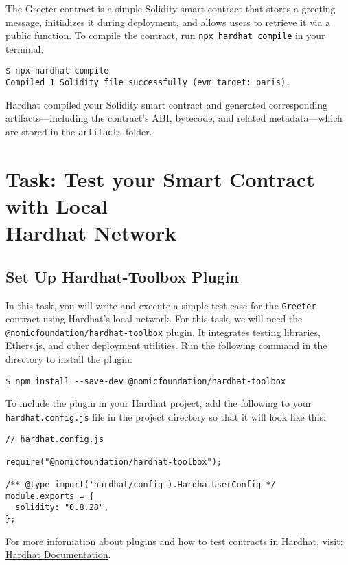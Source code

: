 \documentclass[12pt]{article}
\newcommand{\codeblack}[1]{%
  \texttt{\colorbox{black!7}{\textcolor{black}{#1}}}%
}
\begin{document}
The Greeter contract is a simple Solidity smart contract that stores a greeting message, initializes it during deployment, and allows users to retrieve it via a public function. To compile the contract, run \codeblack{npx hardhat compile} in your terminal.

\begin{verbatim}
$ npx hardhat compile
Compiled 1 Solidity file successfully (evm target: paris).
\end{verbatim}

Hardhat compiled your Solidity smart contract and generated corresponding artifacts—including the contract's ABI, bytecode, and related metadata—which are stored in the \texttt{artifacts} folder.

\section{Task: Test your Smart Contract with Local \\ Hardhat Network}

\subsection{Set Up Hardhat-Toolbox Plugin}
In this task, you will write and execute a simple test case for the \texttt{Greeter} contract using Hardhat's local network. For this task, we will need the \texttt{@nomicfoundation/hardhat-toolbox} plugin. It integrates testing libraries, Ethers.js, and other deployment utilities. Run the following command in the directory to install the plugin:

\begin{verbatim}
$ npm install --save-dev @nomicfoundation/hardhat-toolbox
\end{verbatim}

To include the plugin in your Hardhat project, add the following to your \texttt{hardhat.config.js} file in the project directory so that it will look like this:

\begin{verbatim}
// hardhat.config.js

require("@nomicfoundation/hardhat-toolbox");

/** @type import('hardhat/config').HardhatUserConfig */
module.exports = {
  solidity: "0.8.28",
};
\end{verbatim}
For more information about plugins and how to test contracts in Hardhat, visit: \\ \href{https://hardhat.org/docs}{Hardhat Documentation}.
\end{document}
